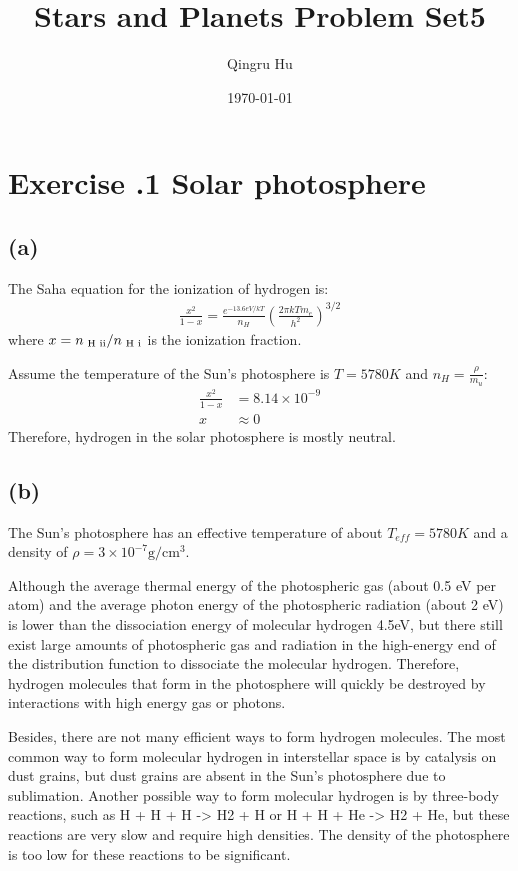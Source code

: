 \documentclass[a4paper,12pt]{article}
\title{\textbf{Stars and Planets Problem Set5}}
\author{Qingru Hu}
\date{\today}
\newcommand{\cm}{\mathrm{cm}}
\newcommand{\g}{\mathrm{g}}
\begin{document}
\maketitle
\section*{\textbf{Exercise \uppercase\expandafter{}.1 Solar photosphere}}
\subsection*{(a)}
The Saha equation for the ionization of hydrogen is:
\begin{align*}
    \frac{x^2}{1-x} = \frac{e^{-13.6eV/kT}}{n_H} (\frac{2\pi kT m_e}{h^2})^{3/2}
\end{align*}
where $x = n_{\text{ H \uppercase\expandafter{\romannumeral2}}} / n_{\text{ H \uppercase\expandafter{\romannumeral1}}}$ is 
the ionization fraction.

Assume the temperature of the Sun's photosphere is $T=5780K$ and $n_H = \frac{\rho}{m_u}$:
\begin{align*}
    \frac{x^2}{1-x} &= 8.14 \times 10^{-9} \\
    x & \approx 0
\end{align*}
Therefore, hydrogen in the solar photosphere is mostly neutral.

\subsection*{(b)}
The Sun's photosphere has an effective temperature of about $T_{eff}=5780 K$ and a density of $\rho = 3 \times 10^{-7} \g/\cm^3$.

Although the average thermal energy of the photospheric gas (about 0.5 eV per atom) and the average photon energy of the photospheric radiation (about 2 eV) is lower than the dissociation energy of molecular hydrogen 4.5eV, 
but there still exist large amounts of photospheric gas and radiation in the high-energy end of the distribution function to dissociate the molecular hydrogen. 
Therefore, hydrogen molecules that form in the photosphere will quickly be destroyed by interactions with high energy gas or photons.

Besides, there are not many efficient ways to form hydrogen molecules. The most common way to form molecular hydrogen in interstellar space is by catalysis on dust grains, 
but dust grains are absent in the Sun's photosphere due to sublimation.
Another possible way to form molecular hydrogen is by three-body reactions, 
such as H + H + H -> H2 + H or H + H + He -> H2 + He, 
but these reactions are very slow and require high densities. 
The density of the photosphere is too low for these reactions to be significant.
\end{document}
